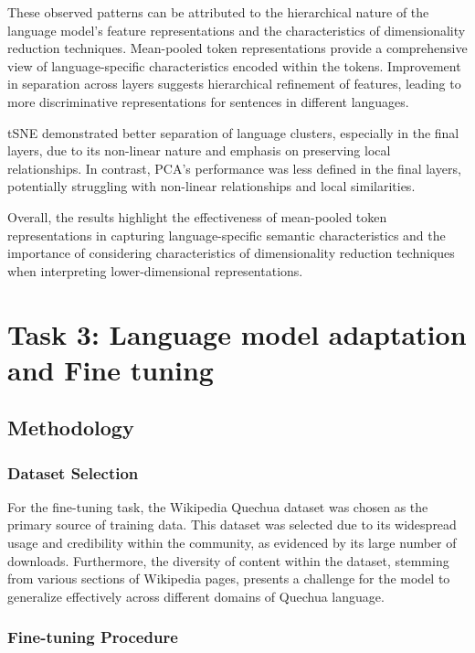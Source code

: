 \documentclass[11pt]{article}
\begin{document}
These observed patterns can be attributed to the hierarchical nature of the language model's feature representations and the characteristics of dimensionality reduction techniques. Mean-pooled token representations provide a comprehensive view of language-specific characteristics encoded within the tokens. Improvement in separation across layers suggests hierarchical refinement of features, leading to more discriminative representations for sentences in different languages.

tSNE demonstrated better separation of language clusters, especially in the final layers, due to its non-linear nature and emphasis on preserving local relationships. In contrast, PCA's performance was less defined in the final layers, potentially struggling with non-linear relationships and local similarities.

Overall, the results highlight the effectiveness of mean-pooled token representations in capturing language-specific semantic characteristics and the importance of considering characteristics of dimensionality reduction techniques when interpreting lower-dimensional representations.

\section{Task 3: Language model adaptation and Fine tuning}

\subsection{Methodology}

\subsubsection{Dataset Selection}

For the fine-tuning task, the Wikipedia Quechua dataset was chosen as the primary source of training data. This dataset was selected due to its widespread usage and credibility within the community, as evidenced by its large number of downloads. Furthermore, the diversity of content within the dataset, stemming from various sections of Wikipedia pages, presents a challenge for the model to generalize effectively across different domains of Quechua language.

\subsubsection{Fine-tuning Procedure}
\end{document}
